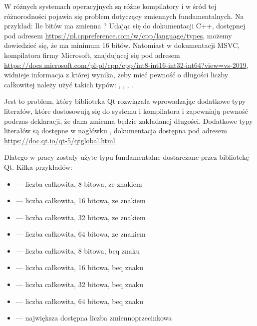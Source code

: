 \par
W różnych systemach operacyjnych są różne kompilatory i w śród tej różnorodności pojawia się problem dotyczący zmiennych fundamentalnych.
Na przykład: Ile bitów ma zmienna ?
Udając się do dokumentacji C++, dostępnej pod adresem \url{https://pl.cppreference.com/w/cpp/language/types}, możemy dowiedzieć się, że  ma minimum 16 bitów.
Natomiast w dokumentacji MSVC, kompilatora firmy Microsoft, znajdującej się pod adresem \url{https://docs.microsoft.com/pl-pl/cpp/cpp/int8-int16-int32-int64?view=vs-2019}, widnieje informacja z której wynika, żeby mieć pewność o długości liczby całkowitej należy użyć takich typów: , , , .
\par
Jest to problem, który biblioteka Qt rozwiązała wprowadzając dodatkowe typy literałów, które dostosowują się do systemu i kompilatora i zapewniają pewność podczas deklaracji, że dana zmienna będzie zakładanej długości.
Dodatkowe typy literałów są dostępne w nagłówku , dokumentacja dostępna pod adresem \url{https://doc.qt.io/qt-5/qtglobal.html}.

\par
Dlatego w pracy zostały użyte typu fundamentalne dostarczane przez bibliotekę Qt.
Kilka przykładów:
\begin{itemize}
    \item {} --- liczba całkowita, 8 bitowa, ze znakiem
    \item {} --- liczba całkowita, 16 bitowa, ze znakiem
    \item {} --- liczba całkowita, 32 bitowa, ze znakiem
    \item {} --- liczba całkowita, 64 bitowa, ze znakiem
    \item {} --- liczba całkowita, 8 bitowa, beq znaku
    \item {} --- liczba całkowita, 16 bitowa, beq znaku
    \item {} --- liczba całkowita, 32 bitowa, beq znaku
    \item {} --- liczba całkowita, 64 bitowa, beq znaku
    \item {} --- największa dostępna liczba zmiennoprzecinkowa
\end{itemize}